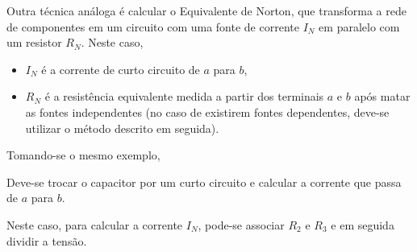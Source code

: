 \documentclass{article}
\numberwithin{equation}{section}
\newlength\Colsep
\begin{document}
Outra técnica análoga é calcular o Equivalente de Norton, que transforma a rede de componentes em um circuito com uma fonte de corrente $I_{N}$ em paralelo com um resistor $R_{N}$. Neste caso,
\begin{itemize}
    \item $I_{N}$ é a corrente de curto circuito de $a$ para $b$,
    \item $R_{N}$ é a resistência equivalente medida a partir dos terminais $a$ e $b$ após matar as fontes independentes (no caso de existirem fontes dependentes, deve-se utilizar o método descrito em seguida).
\end{itemize}

Tomando-se o mesmo exemplo,

\noindent\begin{minipage}{\textwidth}
\begin{minipage}[c][4cm][c]{\dimexpr0.5\textwidth-0.5\Colsep\relax}
    \begin{center}
    \end{center}
\end{minipage}
\begin{minipage}[c][4cm][c]{\dimexpr0.5\textwidth-0.5\Colsep\relax}
    Deve-se trocar o capacitor por um curto circuito e calcular a corrente que passa de $a$ para $b$.
\end{minipage}
\end{minipage}

    \noindent\begin{minipage}{\textwidth}
    \begin{minipage}[c][4cm][c]{\dimexpr0.5\textwidth-0.5\Colsep\relax}
        \begin{center}
        \end{center}
    \end{minipage}
    \begin{minipage}[c][4cm][c]{\dimexpr0.5\textwidth-0.5\Colsep\relax}
        Neste caso, para calcular a corrente $I_N$, pode-se associar $R_2$ e $R_3$ e em seguida dividir a tensão.
    \end{minipage}
    \end{minipage}
\end{document}
